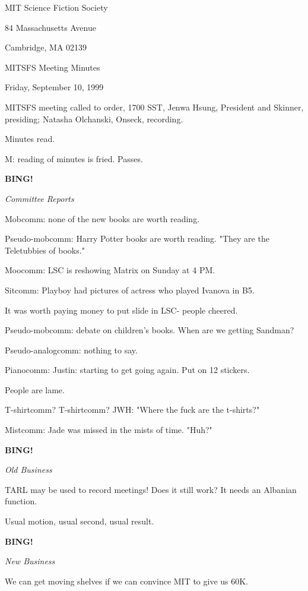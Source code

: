 \documentclass[12pt]{article}
\newcommand{\bing}{{\bf BING!} }
\newcommand{\goto}[1]{\bing \vskip 12pt \centerline{{\em{#1}}}}
\begin{document}
\begin{center}

MIT Science Fiction Society 

84 Massachusetts Avenue

Cambridge, MA 02139

\vspace{12pt}

MITSFS Meeting Minutes 

Friday, September 10, 1999

\end{center}
 
\vspace{18pt}

\setlength{\parskip}{6pt}

\noindent
MITSFS meeting called to order, 1700 SST,
Jenwa Hsung, President and Skinner, presiding; Natasha Olchanski, Onseck, recording.

Minutes read.

M: reading of minutes is fried. Passes.

\goto{Committee Reports}

Mobcomm: none of the new books are worth reading.

Pseudo-mobcomm: Harry Potter books are worth reading. "They are the Teletubbies of books."

Moocomm: LSC is reshowing Matrix on Sunday at 4 PM.

Sitcomm: Playboy had pictures of actress who played Ivanova in B5.

It was worth paying money to put slide in LSC- people cheered.

Pseudo-mobcomm: debate on children's books. When are we getting Sandman?

Pseudo-analogcomm: nothing to say.

Pianocomm: Justin: starting to get going again. Put on 12 stickers.

People are lame.

T-shirtcomm? T-shirtcomm? JWH: "Where the fuck are the t-shirts?"

Mistcomm: Jade was missed in the mists of time. "Huh?"

\goto{Old Business}

TARL may be used to record meetings! Does it still work? It needs an Albanian function.

Usual motion, usual second, usual result.

\goto{New Business}

We can get moving shelves if we can convince MIT to give us 60K.
\end{document}
